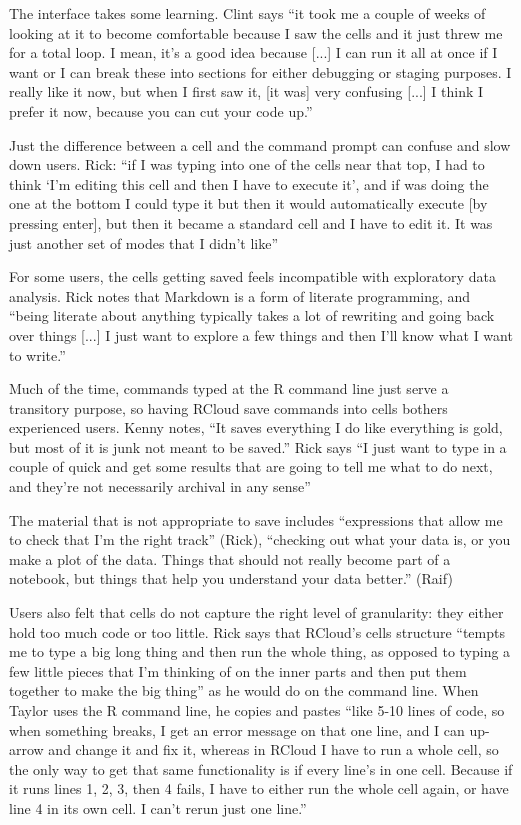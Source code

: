The interface takes some learning. Clint says ``it took me a couple of weeks of
looking at it to become comfortable because I saw the cells and it just threw me
for a total loop. I mean, it's a good idea because [...] I can run it all at
once if I want or I can break these into sections for either debugging or
staging purposes. I really like it now, but when I first saw it, [it was] very
confusing [...] I think I prefer it now, because you can cut your code up.''

Just the difference between a cell and the command prompt can confuse and slow
down users. Rick: ``if I was typing into one of the cells near that top, I had
to think `I'm editing this cell and then I have to execute it', and if was doing
the one at the bottom I could type it but then it would automatically execute
[by pressing enter], but then it became a standard cell and I have to edit
it. It was just another set of modes that I didn't like''

For some users, the cells getting saved feels incompatible with exploratory data
analysis. Rick notes that Markdown is a form of literate programming, and
``being literate about anything typically takes a lot of rewriting and going
back over things [...] I just want to explore a few things and then I'll know
what I want to write.''

Much of the time, commands typed at the R command line just serve a transitory
purpose, so having RCloud save commands into cells bothers experienced
users. Kenny notes, ``It saves everything I do like everything is gold, but most
of it is junk not meant to be saved.'' Rick says ``I just want to type in a
couple of quick and get some results that are going to tell me what to do next,
and they're not necessarily archival in any sense''

The material that is not appropriate to save includes ``expressions that allow
me to check that I'm the right track'' (Rick), ``checking out what your data is,
or you make a plot of the data. Things that should not really become part of a
notebook, but things that help you understand your data better.'' (Raif)

Users also felt that cells do not capture the right level of granularity: they
either hold too much code or too little. Rick says that RCloud's cells structure
``tempts me to type a big long thing and then run the whole thing, as opposed to
typing a few little pieces that I'm thinking of on the inner parts and then put
them together to make the big thing'' as he would do on the command line. When
Taylor uses the R command line, he copies and pastes ``like 5-10 lines of code,
so when something breaks, I get an error message on that one line, and I can
up-arrow and change it and fix it, whereas in RCloud I have to run a whole cell,
so the only way to get that same functionality is if every line's in one
cell. Because if it runs lines 1, 2, 3, then 4 fails, I have to either run the
whole cell again, or have line 4 in its own cell. I can't rerun just one line.''

